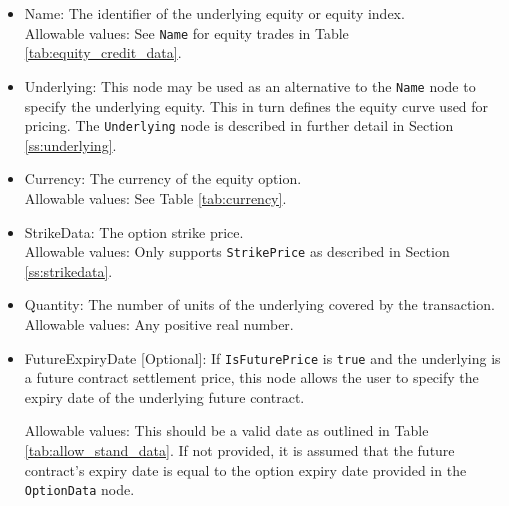 \begin{itemize}
	\item Name: The identifier of the underlying equity or equity index. \\
	Allowable values:  See \lstinline!Name! for equity trades in Table \ref{tab:equity_credit_data}. \\
	\item Underlying:  This node may be used as an alternative to the \lstinline!Name! node to specify the underlying equity. This in turn defines the equity curve used for pricing. The \lstinline!Underlying! node is described in further detail in Section \ref{ss:underlying}. \\
	\item Currency: The currency of the equity option. \\
	Allowable values:  See Table \ref{tab:currency}.	
	\item StrikeData: The option strike price. \\
	Allowable values: Only supports \lstinline!StrikePrice! as described in Section \ref{ss:strikedata}.
	\item Quantity: The number of units of the underlying covered by the transaction. \\
	Allowable values:  Any positive real number.
    \item FutureExpiryDate [Optional]: If \lstinline!IsFuturePrice! is \lstinline!true! and the underlying is a future contract settlement price, this node allows the user to specify the expiry date of the underlying future contract.

    Allowable values: This should be a valid date as outlined in Table \ref{tab:allow_stand_data}. If not provided, it is assumed that the future contract's expiry date is equal to the option expiry date provided in the \lstinline!OptionData! node.
\end{itemize}
